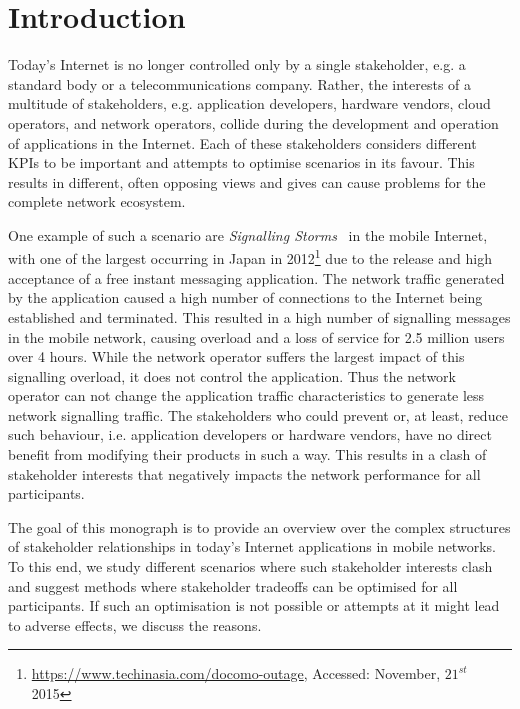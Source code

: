 \chapter{Introduction}\label{chap:introduction}

Today's Internet is no longer controlled only by a single stakeholder, e.g. a standard body or a telecommunications company.
Rather, the interests of a multitude of stakeholders, e.g. application developers, hardware vendors, cloud operators, and network operators, collide during the development and operation of applications in the Internet. 
Each of these stakeholders considers different \glspl{KPI} to be important and attempts to optimise scenarios in its favour.
This results in different, often opposing views and gives can cause problems for the complete network ecosystem. 

One example of such a scenario are \emph{Signalling Storms}~\cite{Huawei2011} in the mobile Internet, with one of the largest occurring in Japan in 2012\footnote{\url{https://www.techinasia.com/docomo-outage}, Accessed: November, \(21^{st}\) 2015} due to the release and high acceptance of a free instant messaging application.
The network traffic generated by the application caused a high number of connections to the Internet being established and terminated.
This resulted in a high number of signalling messages in the mobile network, causing overload and a loss of service for 2.5 million users over 4 hours.
While the network operator suffers the largest impact of this signalling overload, it does not control the application.
Thus the network operator can not change the application traffic characteristics to generate less network signalling traffic. 
The stakeholders who could prevent or, at least, reduce such behaviour, i.e. application developers or hardware vendors, have no direct benefit from modifying their products in such a way.
This results in a clash of stakeholder interests that negatively impacts the network performance for all participants.

The goal of this monograph is to provide an overview over the complex structures of stakeholder relationships in today's Internet applications in mobile networks.
To this end, we study different scenarios where such stakeholder interests clash and suggest methods where stakeholder tradeoffs can be optimised for all participants.
If such an optimisation is not possible or attempts at it might lead to adverse effects, we discuss the reasons.

